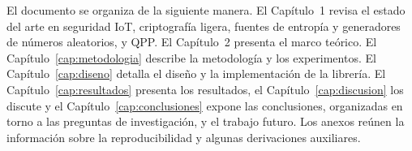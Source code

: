 El documento se organiza de la siguiente manera. El Capítulo~1 revisa el estado del arte en seguridad IoT, criptografía ligera, fuentes de entropía y generadores de números aleatorios, y QPP. El Capítulo~2 presenta el marco teórico. El Capítulo~\ref{cap:metodologia} describe la metodología y los experimentos. El Capítulo~\ref{cap:diseno} detalla el diseño y la implementación de la librería. El Capítulo~\ref{cap:resultados} presenta los resultados, el Capítulo~\ref{cap:discusion} los discute y el Capítulo~\ref{cap:conclusiones} expone las conclusiones, organizadas en torno a las preguntas de investigación, y el trabajo futuro. Los anexos reúnen la información sobre la reproducibilidad y algunas derivaciones auxiliares.
